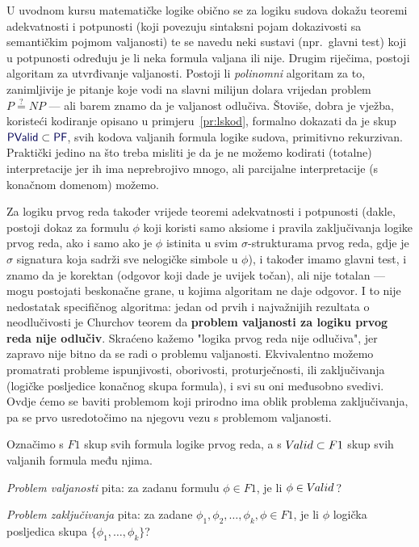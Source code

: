 U uvodnom kursu matematičke logike obično se za logiku sudova dokažu teoremi adekvatnosti i potpunosti (koji povezuju sintaksni pojam dokazivosti sa semantičkim pojmom valjanosti) te se navedu neki sustavi (npr.\ glavni test) koji u potpunosti određuju je li neka formula valjana ili nije. Drugim riječima, postoji algoritam za utvrđivanje valjanosti. Postoji li \emph{polinomni} algoritam za to, zanimljivije je pitanje koje vodi na slavni milijun dolara vrijedan problem $P\stackrel?=NP$ --- ali barem znamo da je valjanost odlučiva. Štoviše, dobra je vježba, koristeći kodiranje opisano u primjeru~\ref{pr:lskod}, formalno dokazati da je skup $\f{PValid}\subset\f{PF}$, svih kodova valjanih formula logike sudova, primitivno rekurzivan. Praktički jedino na što treba misliti je da je ne možemo kodirati (totalne) interpretacije jer ih ima neprebrojivo mnogo, ali parcijalne interpretacije (s konačnom domenom) možemo.

Za logiku prvog reda također vrijede teoremi adekvatnosti i potpunosti (dakle, postoji dokaz za formulu $\phi$ koji koristi samo aksiome i pravila zaključivanja logike prvog reda, ako i samo ako je $\phi$ istinita u svim $\sigma$-strukturama prvog reda, gdje je $\sigma$ signatura koja sadrži sve nelogičke simbole u $\phi$), i također imamo glavni test, i znamo da je korektan (odgovor koji dade je uvijek točan), ali nije totalan --- mogu postojati beskonačne grane, u kojima algoritam ne daje odgovor. I to nije nedostatak specifičnog algoritma: jedan od prvih i najvažnijih rezultata o neodlučivosti je Churchov teorem da \textbf{problem valjanosti za logiku prvog reda nije odlučiv}. Skraćeno kažemo "logika prvog reda nije odlučiva", jer zapravo nije bitno da se radi o problemu valjanosti. Ekvivalentno možemo promatrati probleme ispunjivosti, oborivosti, proturječnosti, ili zaključivanja (logičke posljedice konačnog skupa formula), i svi su oni međusobno svedivi. Ovdje ćemo se baviti problemom koji prirodno ima oblik problema zaključivanja, pa se prvo usredotočimo na njegovu vezu s problemom valjanosti.

\begin{definicija}[{name=[problem valjanosti i problem zaključivanja]}]
    Označimo s $F1$ skup svih formula logike prvog reda,\newline
	\hspace*{6.1em}
	a s $V\mspace{-1.5mu}alid\subset F1$ skup svih valjanih formula među njima.

	\emph{Problem valjanosti} pita: za zadanu formulu $\phi\in F1$, je li $\phi\in V\mspace{-1.5mu}alid\mspace{2mu}$?

\emph{Problem zaključivanja} pita: za zadane $\phi_1,\phi_2,\dotsc,\phi_k,\phi\in F1$,\newline
	\hspace*{14.1em}je li $\phi$ logička posljedica skupa $\{\phi_1,\dotsc,\phi_k\}$?
\end{definicija}

